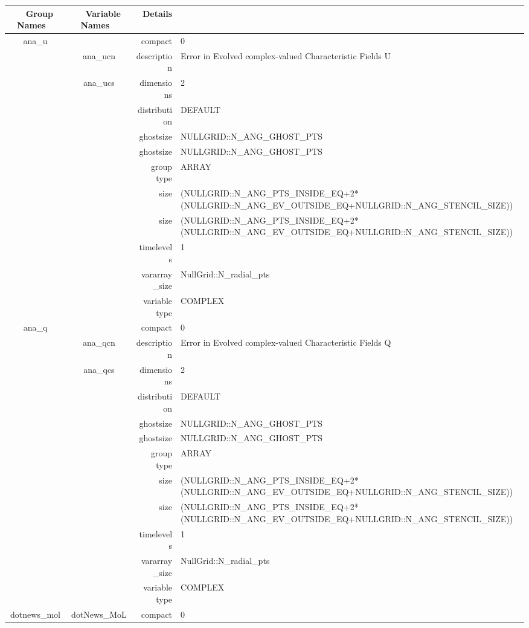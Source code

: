 \begin{tabular*}{150mm}{|c|c@{\extracolsep{\fill}}|rl|} \hline 
~ {\bf Group Names} ~ & ~ {\bf Variable Names} ~  &{\bf Details} ~ & ~ \\ 
\hline 
ana\_u &  & compact & 0 \\ 
 & ana\_ucn & description & Error in Evolved complex-valued Characteristic Fields U \\ 
 & ana\_ucs & dimensions & 2 \\ 
 &  & distribution & DEFAULT \\ 
 &  & ghostsize & NULLGRID::N\_ANG\_GHOST\_PTS \\ 
& ~ & ghostsize & NULLGRID::N\_ANG\_GHOST\_PTS \\ 
 &  & group type & ARRAY \\ 
 &  & size & (NULLGRID::N\_ANG\_PTS\_INSIDE\_EQ+2*(NULLGRID::N\_ANG\_EV\_OUTSIDE\_EQ+NULLGRID::N\_ANG\_STENCIL\_SIZE)) \\ 
& ~ & size & (NULLGRID::N\_ANG\_PTS\_INSIDE\_EQ+2*(NULLGRID::N\_ANG\_EV\_OUTSIDE\_EQ+NULLGRID::N\_ANG\_STENCIL\_SIZE)) \\ 
 &  & timelevels & 1 \\ 
 &  & vararray\_size & NullGrid::N\_radial\_pts \\ 
 &  & variable type & COMPLEX \\ 
\hline 
ana\_q &  & compact & 0 \\ 
 & ana\_qcn & description & Error in Evolved complex-valued Characteristic Fields Q \\ 
 & ana\_qcs & dimensions & 2 \\ 
 &  & distribution & DEFAULT \\ 
 &  & ghostsize & NULLGRID::N\_ANG\_GHOST\_PTS \\ 
& ~ & ghostsize & NULLGRID::N\_ANG\_GHOST\_PTS \\ 
 &  & group type & ARRAY \\ 
 &  & size & (NULLGRID::N\_ANG\_PTS\_INSIDE\_EQ+2*(NULLGRID::N\_ANG\_EV\_OUTSIDE\_EQ+NULLGRID::N\_ANG\_STENCIL\_SIZE)) \\ 
& ~ & size & (NULLGRID::N\_ANG\_PTS\_INSIDE\_EQ+2*(NULLGRID::N\_ANG\_EV\_OUTSIDE\_EQ+NULLGRID::N\_ANG\_STENCIL\_SIZE)) \\ 
 &  & timelevels & 1 \\ 
 &  & vararray\_size & NullGrid::N\_radial\_pts \\ 
 &  & variable type & COMPLEX \\ 
\hline 
dotnews\_mol & dotNews\_MoL & compact & 0 \\ 

\end{tabular*}
